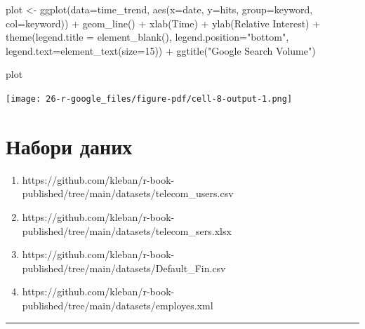 \documentclass[
  letterpaper,
  DIV=11,
  numbers=noendperiod]{scrreprt}
\newenvironment{Shaded}{\begin{snugshade}}{\end{snugshade}}
\newcommand{\AttributeTok}[1]{\textcolor[rgb]{0.40,0.45,0.13}{#1}}
\newcommand{\DecValTok}[1]{\textcolor[rgb]{0.68,0.00,0.00}{#1}}
\newcommand{\FunctionTok}[1]{\textcolor[rgb]{0.28,0.35,0.67}{#1}}
\newcommand{\NormalTok}[1]{\textcolor[rgb]{0.00,0.23,0.31}{#1}}
\newcommand{\OtherTok}[1]{\textcolor[rgb]{0.00,0.23,0.31}{#1}}
\newcommand{\SpecialCharTok}[1]{\textcolor[rgb]{0.37,0.37,0.37}{#1}}
\newcommand{\StringTok}[1]{\textcolor[rgb]{0.13,0.47,0.30}{#1}}
\providecommand{\tightlist}{%
  \setlength{\itemsep}{0pt}\setlength{\parskip}{0pt}}\usepackage{longtable,booktabs,array}
\begin{document}
\begin{Shaded}
\begin{Highlighting}[]
\NormalTok{plot }\OtherTok{\textless{}{-}} \FunctionTok{ggplot}\NormalTok{(}\AttributeTok{data=}\NormalTok{time\_trend, }\FunctionTok{aes}\NormalTok{(}\AttributeTok{x=}\NormalTok{date, }\AttributeTok{y=}\NormalTok{hits, }\AttributeTok{group=}\NormalTok{keyword, }\AttributeTok{col=}\NormalTok{keyword)) }\SpecialCharTok{+}
  \FunctionTok{geom\_line}\NormalTok{() }\SpecialCharTok{+}
  \FunctionTok{xlab}\NormalTok{(}\StringTok{\textquotesingle{}Time\textquotesingle{}}\NormalTok{) }\SpecialCharTok{+} 
  \FunctionTok{ylab}\NormalTok{(}\StringTok{\textquotesingle{}Relative Interest\textquotesingle{}}\NormalTok{) }\SpecialCharTok{+} 
  \FunctionTok{theme}\NormalTok{(}\AttributeTok{legend.title =} \FunctionTok{element\_blank}\NormalTok{(), }\AttributeTok{legend.position=}\StringTok{"bottom"}\NormalTok{, }\AttributeTok{legend.text=}\FunctionTok{element\_text}\NormalTok{(}\AttributeTok{size=}\DecValTok{15}\NormalTok{)) }\SpecialCharTok{+} 
  \FunctionTok{ggtitle}\NormalTok{(}\StringTok{"Google Search Volume"}\NormalTok{)  }

\NormalTok{plot}
\end{Highlighting}
\end{Shaded}

\texttt{[image: 26-r-google\_files/figure-pdf/cell-8-output-1.png]}

\section{Набори
даних}\label{ux43dux430ux431ux43eux440ux438-ux434ux430ux43dux438ux445-4}

\begin{enumerate}
\def\labelenumi{\arabic{enumi}.}
\tightlist
\item
  https://github.com/kleban/r-book-published/tree/main/datasets/telecom\_users.csv
\item
  https://github.com/kleban/r-book-published/tree/main/datasets/telecom\_sers.xlsx
\item
  https://github.com/kleban/r-book-published/tree/main/datasets/Default\_Fin.csv
\item
  https://github.com/kleban/r-book-published/tree/main/datasets/employes.xml
\end{enumerate}

\begin{center}\rule{0.5\linewidth}{0.5pt}\end{center}
\end{document}
